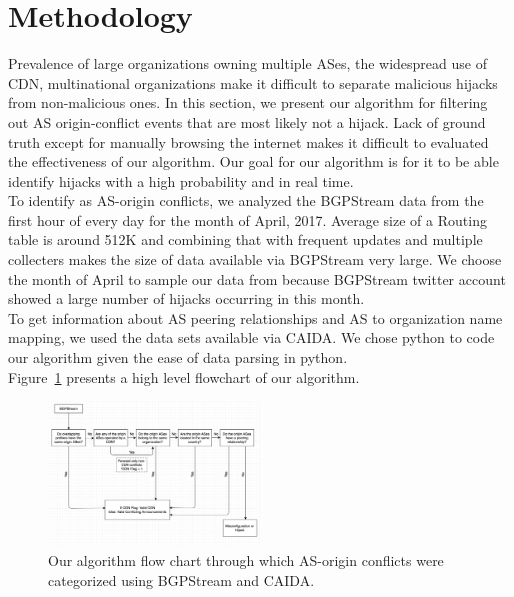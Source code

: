  \section{Methodology}\label{sec:methodology}
Prevalence of large organizations owning multiple ASes, the widespread use of CDN, multinational organizations make it difficult to separate malicious hijacks from non-malicious ones. In this section, we present our algorithm for filtering out AS origin-conflict events that are most likely not a hijack. Lack of ground truth except for manually browsing the internet makes it difficult to evaluated the effectiveness of our algorithm. Our goal for our algorithm is for it to be able identify hijacks with a high probability and in real time.\\
To identify as AS-origin conflicts, we analyzed the BGPStream data from the first hour of every day for the month of April, 2017. Average size of a Routing table is around 512K and combining that with frequent updates and multiple collecters makes the size of data available via BGPStream very large\cite{noauthor_bgp_nodate}. We choose the month of April to sample our data from because BGPStream twitter account showed  a large number of hijacks occurring in this month.\\To get information about AS peering relationships and AS to organization name mapping, we used the data sets available via CAIDA\cite{mapping}. We chose python to code our algorithm given the ease of data parsing in python.\\ 
Figure~\ref{fig:flowchart} presents a high level flowchart of our algorithm.
 \begin{figure}[!htbp]
	\includegraphics[width=0.5\textwidth]{flow.png}
	\caption{Our algorithm flow chart through which AS-origin conflicts were categorized using BGPStream and CAIDA.}
	\label{fig:flowchart}
\end{figure}

